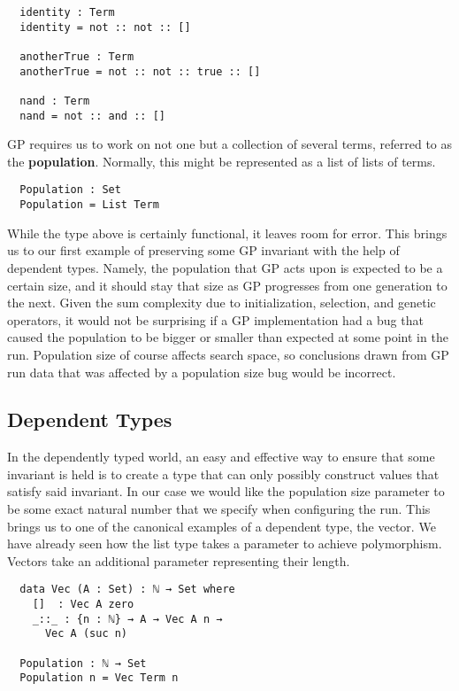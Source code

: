 \documentclass{acm_proc_article-sp}
\begin{document}
\begin{verbatim}
  identity : Term
  identity = not :: not :: []

  anotherTrue : Term
  anotherTrue = not :: not :: true :: []

  nand : Term
  nand = not :: and :: []
\end{verbatim}

GP requires us to work on not one but a collection of several terms,
referred to as the \textbf{population}. Normally, this might be
represented as a list of lists of terms.

\begin{verbatim}
  Population : Set
  Population = List Term
\end{verbatim}

While the type above is certainly functional, it leaves room for
error. This brings us to our first example of preserving some GP
invariant with the help of dependent types. Namely, the population
that GP acts upon is expected to be a certain size, and it should stay
that size as GP progresses from one generation to the next. Given the
sum complexity due to initialization, selection, and genetic
operators, it would not be surprising if a GP implementation had a bug
that caused the population to be bigger or smaller than expected
at some point in the run. Population size of course affects search
space, so conclusions drawn from GP run data that was affected by a
population size bug would be incorrect.

\subsection{Dependent Types}

In the dependently typed world, an easy and effective way to ensure
that some invariant is held is to create a type that can only possibly
construct values that satisfy said invariant. In our case we would
like the population size parameter to be some exact natural number
that we specify when configuring the run. This brings us to one of
the canonical examples of a dependent type, the vector. We have
already seen how the list type takes a parameter to achieve
polymorphism. Vectors take an additional parameter representing their
length.

\begin{verbatim}
  data Vec (A : Set) : ℕ → Set where
    []  : Vec A zero
    _::_ : {n : ℕ} → A → Vec A n →
      Vec A (suc n)

  Population : ℕ → Set
  Population n = Vec Term n
\end{verbatim}
\end{document}
